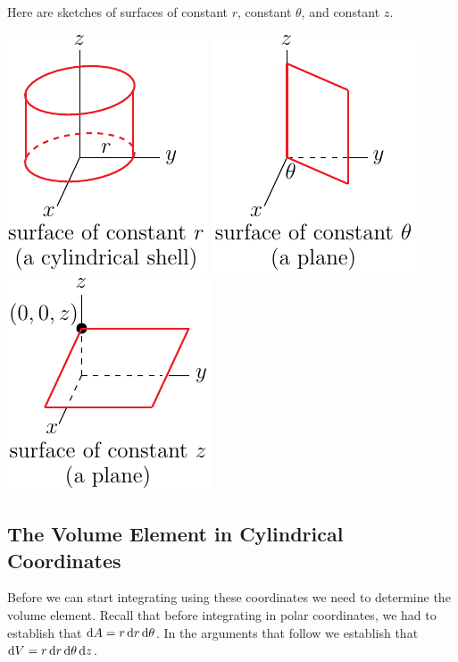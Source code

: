Here are sketches of surfaces of constant $r$, constant $\theta$, and constant $z$.
\begin{wfig}
\begin{center}
    \includegraphics{../figs_coord/cyl3.pdf}\qquad
    \includegraphics{../figs_coord/cyl4.pdf}\qquad
    \includegraphics{../figs_coord/cyl2.pdf}
\end{center}
\end{wfig}

\subsection{The Volume Element in Cylindrical Coordinates} \label{sec cylindrical vol}
 Before we can start integrating using these coordinates 
we need to determine the volume element. Recall that before integrating
in polar coordinates, we had to establish that 
$\mathrm{d}A=r\,\mathrm{d}r\,\mathrm{d}\theta$. In the arguments that follow we establish 
that $\mathrm{d}V =r\,\mathrm{d}r\,\mathrm{d}\theta\,\mathrm{d}z$.


